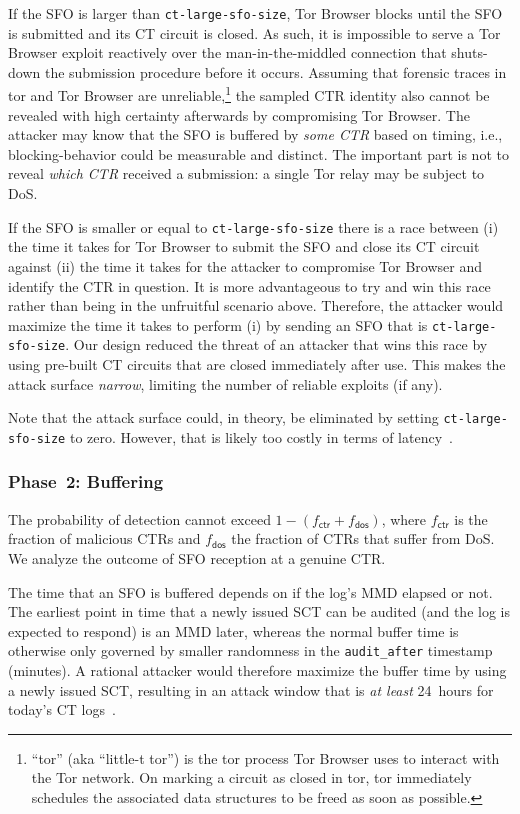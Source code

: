 If the SFO is larger than \texttt{ct-large-sfo-size}, Tor Browser blocks until
the SFO is submitted and its CT circuit is closed.  As such, it is impossible to
serve a Tor Browser exploit reactively over the man-in-the-middled connection
that shuts-down the submission procedure before it occurs.  Assuming that
forensic traces in tor and Tor Browser are unreliable,\footnote{%
	``tor'' (aka ``little-t tor'') is the tor process Tor Browser uses to
	interact with the Tor network.  On marking a circuit as closed in tor, tor
	immediately schedules the associated data structures to be freed as soon as
	possible.
} the sampled CTR identity also cannot be revealed with high certainty
afterwards by compromising Tor Browser.  The attacker may know that the SFO is
buffered by \emph{some CTR} based on timing, i.e., blocking-behavior could be 
measurable and distinct.  The important part is not to reveal \emph{which CTR}
received a submission:  a single Tor relay may be subject to DoS.

If the SFO is smaller or equal to \texttt{ct-large-sfo-size} there is a
race between (i) the time it takes for Tor Browser to submit the SFO and close
its CT circuit against (ii) the time it takes for the attacker to compromise Tor
Browser and identify the CTR in question.  It is more advantageous to try and
win this race rather than being in the unfruitful scenario above.  Therefore,
the attacker would maximize the time it takes to perform (i) by sending an SFO
that is \texttt{ct-large-sfo-size}.  Our design reduced the threat of an
attacker that wins this race by using pre-built CT circuits that are closed
immediately after use.  This makes the attack surface \emph{narrow}, limiting
the number of reliable exploits (if any).

Note that the attack surface could, in theory, be eliminated by setting
\texttt{ct-large-sfo-size} to zero.  However, that is likely  too costly in
terms of latency~\cite{no-hard-fail}.

\subsubsection{Phase~2: Buffering} \label{sec:analysis:pr:phase2}
The probability of detection cannot exceed $1-(f_{\mathsf{ctr}} +
f_{\mathsf{dos}})$, where $f_{\mathsf{ctr}}$ is the fraction of
malicious CTRs and $f_{\mathsf{dos}}$ the fraction of CTRs that suffer from
DoS.  We analyze the outcome of SFO reception at a genuine CTR\@.

The time that an SFO is buffered depends on if the log's MMD elapsed or not.
The earliest point in time that a newly issued SCT can be audited (and the log
is expected to respond) is an MMD later, whereas the normal buffer time is
otherwise only governed by smaller randomness in the \texttt{audit\_after}
timestamp (minutes).  A rational attacker would therefore maximize the buffer
time by using a newly issued SCT, resulting in an attack window that is \emph{at
least} 24~hours for today's CT logs~\cite{google-log-policy}.

